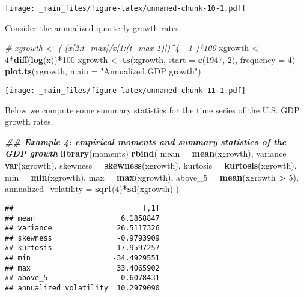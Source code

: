 \documentclass[
]{book}
\newenvironment{Shaded}{\begin{snugshade}}{\end{snugshade}}
\newcommand{\AttributeTok}[1]{\textcolor[rgb]{0.13,0.29,0.53}{#1}}
\newcommand{\CommentTok}[1]{\textcolor[rgb]{0.56,0.35,0.01}{\textit{#1}}}
\newcommand{\DecValTok}[1]{\textcolor[rgb]{0.00,0.00,0.81}{#1}}
\newcommand{\DocumentationTok}[1]{\textcolor[rgb]{0.56,0.35,0.01}{\textbf{\textit{#1}}}}
\newcommand{\FunctionTok}[1]{\textcolor[rgb]{0.13,0.29,0.53}{\textbf{#1}}}
\newcommand{\NormalTok}[1]{#1}
\newcommand{\OtherTok}[1]{\textcolor[rgb]{0.56,0.35,0.01}{#1}}
\newcommand{\SpecialCharTok}[1]{\textcolor[rgb]{0.81,0.36,0.00}{\textbf{#1}}}
\newcommand{\StringTok}[1]{\textcolor[rgb]{0.31,0.60,0.02}{#1}}
\begin{document}
\texttt{[image: \_main\_files/figure-latex/unnamed-chunk-10-1.pdf]}

Consider the annualized quarterly growth rates:

\begin{Shaded}
\begin{Highlighting}[]
\CommentTok{\# xgrowth \textless{}{-} ( (x[2:t\_max]/x[1:(t\_max{-}1)])\^{}4 {-} 1 )*100}
\NormalTok{xgrowth }\OtherTok{\textless{}{-}} \DecValTok{4}\SpecialCharTok{*}\FunctionTok{diff}\NormalTok{(}\FunctionTok{log}\NormalTok{(x))}\SpecialCharTok{*}\DecValTok{100}
\NormalTok{xgrowth }\OtherTok{\textless{}{-}} \FunctionTok{ts}\NormalTok{(xgrowth, }\AttributeTok{start =} \FunctionTok{c}\NormalTok{(}\DecValTok{1947}\NormalTok{, }\DecValTok{2}\NormalTok{), }\AttributeTok{frequency =} \DecValTok{4}\NormalTok{)}
\FunctionTok{plot.ts}\NormalTok{(xgrowth, }\AttributeTok{main =} \StringTok{"Annualized GDP growth"}\NormalTok{)}
\end{Highlighting}
\end{Shaded}

\texttt{[image: \_main\_files/figure-latex/unnamed-chunk-11-1.pdf]}

Below we compute some summary statistics for the time series of the U.S. GDP growth rates.

\begin{Shaded}
\begin{Highlighting}[]
\DocumentationTok{\#\# Example 4: empirical moments and summary statistics of the GDP growth}
\FunctionTok{library}\NormalTok{(moments)}
\FunctionTok{rbind}\NormalTok{(}
  \AttributeTok{mean     =} \FunctionTok{mean}\NormalTok{(xgrowth),}
  \AttributeTok{variance =} \FunctionTok{var}\NormalTok{(xgrowth),}
  \AttributeTok{skewness =} \FunctionTok{skewness}\NormalTok{(xgrowth),}
  \AttributeTok{kurtosis =} \FunctionTok{kurtosis}\NormalTok{(xgrowth),}
  \AttributeTok{min      =} \FunctionTok{min}\NormalTok{(xgrowth),}
  \AttributeTok{max      =} \FunctionTok{max}\NormalTok{(xgrowth),}
  \AttributeTok{above\_5  =} \FunctionTok{mean}\NormalTok{(xgrowth }\SpecialCharTok{\textgreater{}} \DecValTok{5}\NormalTok{),}
  \AttributeTok{annualized\_volatility =} \FunctionTok{sqrt}\NormalTok{(}\DecValTok{4}\NormalTok{)}\SpecialCharTok{*}\FunctionTok{sd}\NormalTok{(xgrowth)}
\NormalTok{)}
\end{Highlighting}
\end{Shaded}

\begin{verbatim}
##                              [,1]
## mean                    6.1858847
## variance               26.5117326
## skewness               -0.9793909
## kurtosis               17.9597257
## min                   -34.4929551
## max                    33.4065902
## above_5                 0.6078431
## annualized_volatility  10.2979090
\end{verbatim}
\end{document}
